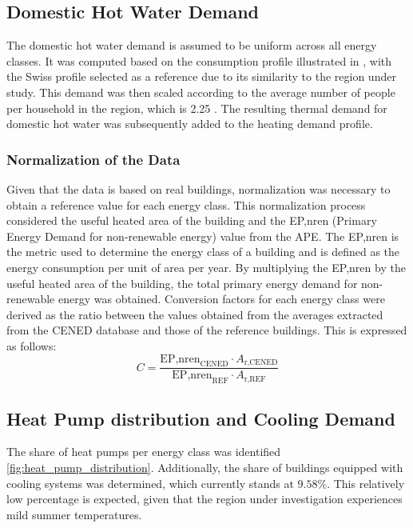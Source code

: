 \subsection{Domestic Hot Water Demand}
The domestic hot water demand is assumed to be uniform across all energy classes. It was computed based on the consumption profile illustrated in \cite{Fuentes2017}, with the Swiss profile selected as a reference due to its similarity to the region under study. This demand was then scaled according to the average number of people per household in the region, which is 2.25 \cite{istat2023}. The resulting thermal demand for domestic hot water was subsequently added to the heating demand profile.

\subsubsection{Normalization of the Data}
Given that the data is based on real buildings, normalization was necessary to obtain a reference value for each energy class. This normalization process considered the useful heated area of the building and the EP,nren (Primary Energy Demand for non-renewable energy) value from the APE. The EP,nren is the metric used to determine the energy class of a building and is defined as the energy consumption per unit of area per year. By multiplying the EP,nren by the useful heated area of the building, the total primary energy demand for non-renewable energy was obtained. Conversion factors for each energy class were derived as the ratio between the values obtained from the averages extracted from the CENED database \cite{cened2025} and those of the reference buildings. This is expressed as follows:
\begin{equation}
    C = \frac{\text{EP,nren}_{\text{CENED}} \cdot A_{\text{r,CENED}}}{\text{EP,nren}_{\text{REF}} \cdot A_{\text{r,REF}}}
\end{equation}

\subsection{Heat Pump distribution and Cooling Demand}
The share of heat pumps per energy class was identified \ref{fig:heat_pump_distribution}. Additionally, the share of buildings equipped with cooling systems was determined, which currently stands at $9.58\%$. This relatively low percentage is expected, given that the region under investigation experiences mild summer temperatures.

